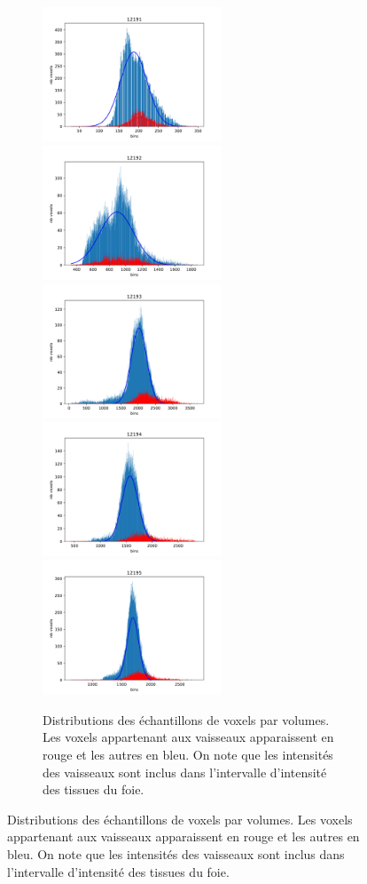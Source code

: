 \begin{figure}[!ht]
  \centering
  \begin{subfigure}{\textwidth}
    \centering
    \includegraphics[height=4cm]{Images/gen_12191.pdf}
    \includegraphics[height=4cm]{Images/gen_12192.pdf}
    \includegraphics[height=4cm]{Images/gen_12193.pdf}
    \includegraphics[height=4cm]{Images/gen_12194.pdf}
    \includegraphics[height=4cm]{Images/gen_12195.pdf}

    \caption{Distributions des échantillons de voxels par volumes. Les voxels appartenant aux vaisseaux apparaissent en rouge et les autres en bleu. On note que les intensités des vaisseaux sont inclus dans l'intervalle d'intensité des tissues du foie.}
  \end{subfigure}


\end{figure}
